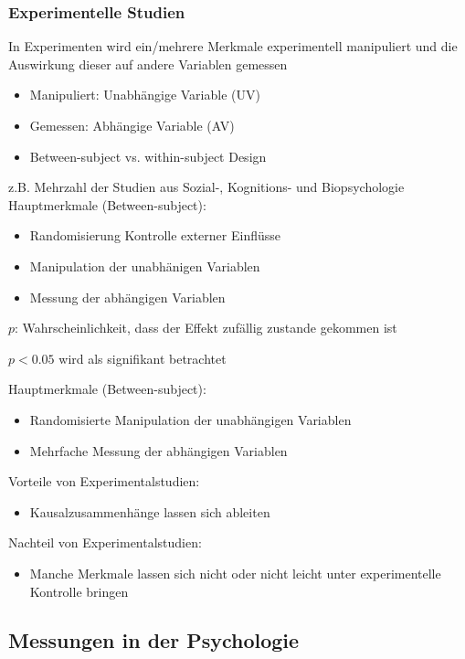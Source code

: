 \subsubsection{Experimentelle Studien}
In Experimenten wird ein/mehrere Merkmale experimentell manipuliert und die Auswirkung dieser auf andere Variablen gemessen
\begin{itemize}
	\item Manipuliert: Unabhängige Variable (UV)
	\item Gemessen: Abhängige Variable (AV)
	\item Between-subject vs. within-subject Design  
\end{itemize} 
z.B. Mehrzahl der Studien aus Sozial-, Kognitions- und Biopsychologie \newline \newline
Hauptmerkmale (Between-subject):
\begin{itemize}
	\item Randomisierung \rightarrow Kontrolle externer Einflüsse
	\item Manipulation der unabhänigen Variablen
	\item Messung der abhängigen Variablen
\end{itemize}
$p$: Wahrscheinlichkeit, dass der Effekt zufällig zustande gekommen ist 

$p < 0.05$ wird als \glqq{}signifikant\grqq{} betrachtet \newline \newline

Hauptmerkmale (Between-subject):
\begin{itemize}
	\item Randomisierte Manipulation der unabhängigen Variablen
	\item Mehrfache Messung der abhängigen Variablen
\end{itemize}
Vorteile von Experimentalstudien: 
\begin{itemize}
	\item Kausalzusammenhänge lassen sich ableiten
\end{itemize}
Nachteil von Experimentalstudien:
\begin{itemize}
	\item Manche Merkmale lassen sich nicht oder nicht leicht unter
experimentelle Kontrolle bringen
\end{itemize} 
\subsection{Messungen in der Psychologie}
